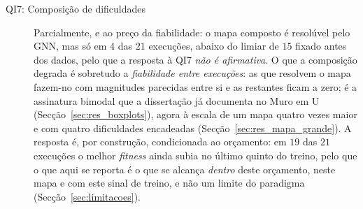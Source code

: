 \documentclass[12pt,reqno, twoside]{amsbook}
\theoremstyle{plain}
\numberwithin{equation}{chapter}
\numberwithin{section}{chapter}
\numberwithin{table}{chapter}
\numberwithin{figure}{chapter}
\begin{document}
\begin{description}
    \item[QI7: Composição de dificuldades] Parcialmente, e ao preço
         da fiabilidade: o mapa composto é resolúvel pelo
         GNN, mas só em 4 das $21$ execuções,
         abaixo do limiar de $15$ fixado antes dos dados, pelo que a resposta à
         QI7 \emph{não é afirmativa}. O que a composição degrada é sobretudo a
         \emph{fiabilidade entre execuções}: as que resolvem o mapa fazem-no
         com magnitudes parecidas entre si e as restantes ficam a zero; é a assinatura
         bimodal que a dissertação já documenta no Muro em U
         (Secção~\ref{sec:res_boxplots}), agora à escala de um mapa quatro vezes
         maior e com quatro dificuldades encadeadas
         (Secção~\ref{sec:res_mapa_grande}). A resposta é, por construção,
         condicionada ao orçamento: em $19$ das $21$ execuções o melhor
         \textit{fitness} ainda subia no último quinto do treino, pelo que o que
         aqui se reporta é o que se alcança \emph{dentro} deste orçamento, neste
         mapa e com este sinal de treino, e não um limite do paradigma
         (Secção~\ref{sec:limitacoes}).

\end{description}

\end{document}
